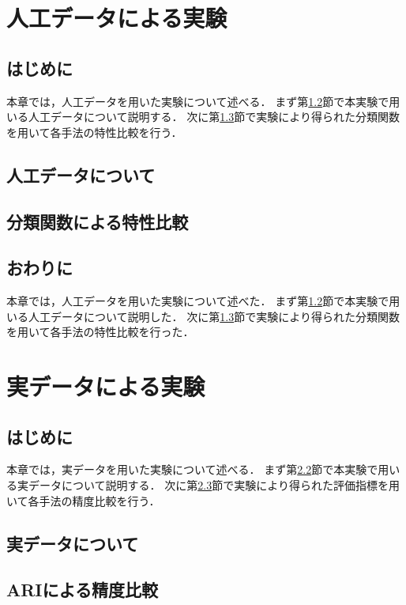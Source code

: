 \documentclass[a4j,12pt,dvipdfmx,oneside]{jsbook}
\theoremstyle{definition}
\begin{document}
\chapter{人工データによる実験}\label{chap:artificial_data}
%
\section{はじめに}\label{sec:artificial_data_intro}
本章では，人工データを用いた実験について述べる．
まず第\ref{sec:about_artificial_data}節で本実験で用いる人工データについて説明する．
次に第\ref{sec:classification_function}節で実験により得られた分類関数を用いて各手法の特性比較を行う．
%
\section{人工データについて}\label{sec:about_artificial_data}
%
\section{分類関数による特性比較}\label{sec:classification_function}
%
\section{おわりに}\label{sec:artificial_data_summary}
本章では，人工データを用いた実験について述べた．
まず第\ref{sec:about_artificial_data}節で本実験で用いる人工データについて説明した．
次に第\ref{sec:classification_function}節で実験により得られた分類関数を用いて各手法の特性比較を行った．
%
%
%
\chapter{実データによる実験}\label{chap:real_data}
%
\section{はじめに}\label{sec:real_data_intro}
本章では，実データを用いた実験について述べる．
まず第\ref{sec:about_real_data}節で本実験で用いる実データについて説明する．
次に第\ref{sec:ari_compare}節で実験により得られた評価指標を用いて各手法の精度比較を行う．
%
\section{実データについて}\label{sec:about_real_data}
%
\section{ARIによる精度比較}\label{sec:ari_compare}
%
\end{document}
